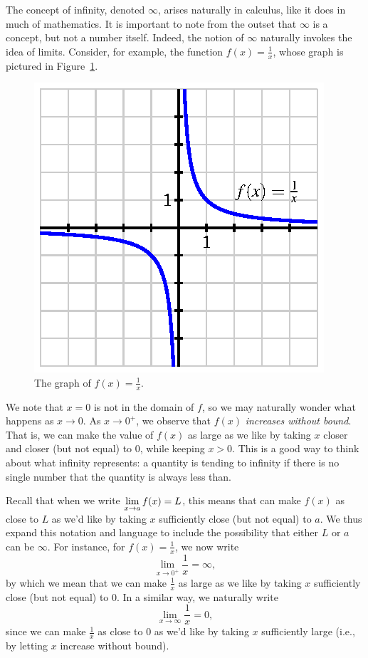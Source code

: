 The concept of infinity, denoted $\infty$, arises naturally in calculus, like it does in much of mathematics.  It is important to note from the outset that $\infty$ is a concept, but not a number itself.  Indeed, the notion of $\infty$ naturally invokes the idea of limits.  Consider, for example, the function $f(x) = \frac{1}{x}$, whose graph is pictured in Figure~\ref{F:2.8.Infty}.
\begin{figure}[h]
\begin{center}
\includegraphics{figures/2_8_Infty.eps}
\caption{The graph of $f(x) = \frac{1}{x}$.} \label{F:2.8.Infty}
\end{center}
\end{figure}
We note that $x = 0$ is not in the domain of $f$, so we may naturally wonder what happens as $x \to 0$.  As $x \to 0^+$, we observe that $f(x)$ \emph{increases without bound}.  That is, we can make the value of $f(x)$ as large as we like by taking $x$ closer and closer (but not equal) to 0, while keeping $x > 0$.  This is a good way to think about what infinity represents:  a quantity is tending to infinity if there is no single number that the quantity is always less than. 

Recall that when we write $\displaystyle \lim_{x \to a} f(x) = L$, this means that can make $f(x)$ as close to $L$ as we'd like by taking $x$ sufficiently close (but not equal) to $a$.  We thus expand this notation and language to include the possibility that either $L$ or $a$ can be $\infty$.  For instance, for $f(x) = \frac{1}{x}$, we now write
$$\lim_{x \to 0^+} \frac{1}{x} = \infty,$$
by which we mean that we can make $\frac{1}{x}$ as large as we like by taking $x$ sufficiently close (but not equal) to 0.  In a similar way, we naturally write
$$\lim_{x \to \infty} \frac{1}{x} = 0,$$
since we can make $\frac{1}{x}$ as close to 0 as we'd like by taking $x$ sufficiently large (i.e., by letting $x$ increase without bound).

